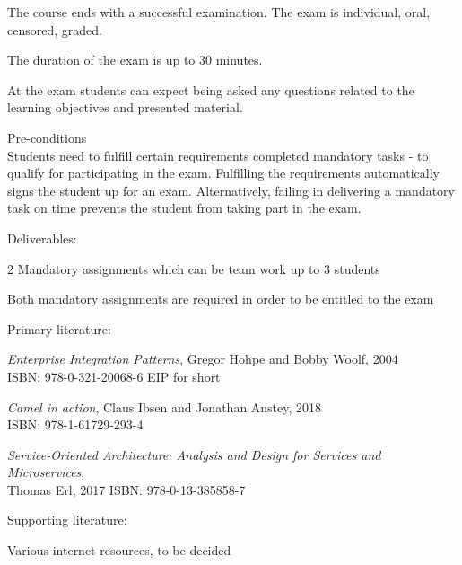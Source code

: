 \documentclass[Screen16to9,17pt]{foils}
\begin{document}

\begin{list2}
\item The course ends with a successful examination. The exam is individual, oral, censored, graded.
\item The duration of the exam is up to 30 minutes.
\item At the exam students can expect being asked any questions related to the learning objectives and presented material.
\end{list2}

Pre-conditions\\
Students need to fulfill certain requirements  completed mandatory tasks - to qualify for participating in the exam.
Fulfilling the requirements automatically signs the student up for an exam. Alternatively, failing in delivering a mandatory
task on time prevents the student from taking part in the exam.

\begin{list2}
\item Deliverables:
\item 2 Mandatory assignments which can be team work up to 3 students
\item Both mandatory assignments are required in order to be entitled to the exam
\end{list2}




Primary literature:
\begin{list2}
\item \emph{Enterprise Integration Patterns}, Gregor Hohpe and Bobby Woolf, 2004\\
ISBN: 978-0-321-20068-6 EIP for short
\item \emph{Camel in action}, Claus Ibsen and Jonathan Anstey, 2018\\
ISBN: 978-1-61729-293-4
\item \emph{Service‑Oriented Architecture: Analysis and Design for Services and Microservices},\\ Thomas Erl, 2017
ISBN: 978-0-13-385858-7
\end{list2}
Supporting literature:
\begin{list2}
\item Various internet resources, to be decided
\end{list2}
\end{document}
